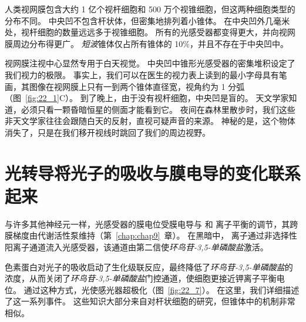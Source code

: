 人类视网膜包含大约 1 亿个视杆细胞和 500 万个视锥细胞，但这两种细胞类型的分布不同。
中央凹不包含杆状体，但密集地排列着小锥体。
在中央凹外几毫米处，视杆细胞的数量远远多于视锥细胞。
所有的光感受器都变得更大，并向视网膜周边分布得更广。
\textit{短波}锥体仅占所有锥体的 10\%，并且不存在于中央凹中。


视网膜注视中心显然专用于白天视觉。
中央凹中锥形光感受器的密集堆积设定了我们视力的极限。
事实上，我们可以在医生的视力表上读到的最小字母具有笔画，其图像在视网膜上只有一到两个锥体直径宽，视角约为 1 分弧（图~\ref{fig:22_1}C）。
到了晚上，由于没有视杆细胞，中央凹是盲的。
天文学家知道，必须只看一颗昏暗恒星的侧面才能看到它。
夜间在森林里散步时，我们这些非天文学家往往会跟随白天的反射，直视可疑声音的来源。 
神秘的是，这个物体消失了，只是在我们移开视线时跳回了我们的周边视野。



\section{光转导将光子的吸收与膜电导的变化联系起来}

与许多其他神经元一样，光感受器的膜电位受膜电导与  和  离子平衡的调节，其跨膜梯度由代谢活性泵维持（第~\ref{chap:chap9}~章）。
在黑暗中， 离子通过非选择性阳离子通道流入光感受器，该通道由第二信使\textit{环鸟苷-3,5-单磷酸盐}激活。


色素蛋白对光子的吸收启动了生化级联反应，最终降低了\textit{环鸟苷-3,5-单磷酸盐}的浓度，从而关闭了\textit{环鸟苷-3,5-单磷酸盐}门控通道，使细胞更接近钾离子平衡电位。
通过这种方式，光使感光器超极化（图~\ref{fig:22_7}）。
在这里，我们详细描述了这一系列事件。
这些知识大部分来自对杆状细胞的研究，但锥体中的机制非常相似。


